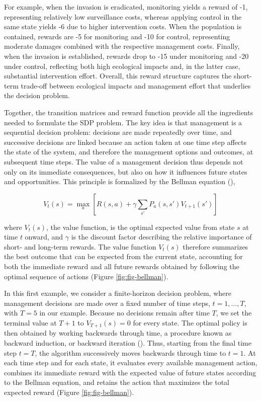 \documentclass[
  11pt,
  a4paper,
]{article}
\begin{document}
For example, when the invasion is eradicated, monitoring yields a reward of -1, representing relatively low surveillance costs, whereas applying control in the same state yields -6 due to higher intervention costs. When the population is contained, rewards are -5 for monitoring and -10 for control, representing moderate damages combined with the respective management costs. Finally, when the invasion is established, rewards drop to -15 under monitoring and -20 under control, reflecting both high ecological impacts and, in the latter case, substantial intervention effort. Overall, this reward structure captures the short-term trade-off between ecological impacts and management effort that underlies the decision problem.

Together, the transition matrices and reward function provide all the ingredients needed to formulate the SDP problem. The key idea is that management is a sequential decision problem: decisions are made repeatedly over time, and successive decisions are linked because an action taken at one time step affects the state of the system, and therefore the management options and outcomes, at subsequent time steps. The value of a management decision thus depends not only on its immediate consequences, but also on how it influences future states and opportunities. This principle is formalized by the Bellman equation (),

\[V_t(s) = \max_a\left[R(s,a)+\gamma\sum_{s'}P_a(s,s')V_{t+1}(s')\right]\]

where \(V_t(s)\), the value function, is the optimal expected value from state \(s\) at time \(t\) onward, and \(\gamma\) is the discount factor describing the relative importance of short- and long-term rewards. The value function \(V_t(s)\) therefore summarizes the best outcome that can be expected from the current state, accounting for both the immediate reward and all future rewards obtained by following the optimal sequence of actions (Figure \ref{fig:fig-bellman}).

In this first example, we consider a finite-horizon decision problem, where management decisions are made over a fixed number of time steps, \(t=1,\ldots,T\), with \(T=5\) in our example. Because no decisions remain after time \(T\), we set the terminal value at \(T+1\) to \(V_{T+1}(s)=0\) for every state. The optimal policy is then obtained by working backwards through time, a procedure known as backward induction, or backward iteration (). Thus, starting from the final time step \(t=T\), the algorithm successively moves backwards through time to \(t=1\). At each time step and for each state, it evaluates every available management action, combines its immediate reward with the expected value of future states according to the Bellman equation, and retains the action that maximizes the total expected reward (Figure \ref{fig:fig-bellman}).
\end{document}
